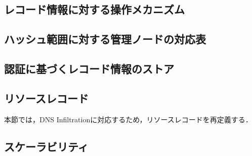 \subsection{レコード情報に対する操作メカニズム}
\subsection{ハッシュ範囲に対する管理ノードの対応表}
\subsection{認証に基づくレコード情報のストア}
\subsection{リソースレコード}
本節では，DNS Infiltrationに対応するため，リソースレコードを再定義する．
\subsection{スケーラビリティ}
